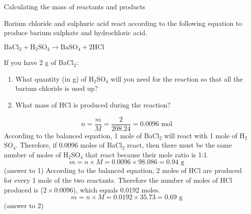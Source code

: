 \begin{wex}{Calculating the mass of reactants and products}{Barium chloride and sulphuric acid react according to the following equation to produce barium sulphate and hydrochloric acid.
\begin{center}
$\text{BaCl}_{2} + \text{H}_{2}\text{SO}_{4} \rightarrow \text{BaSO}_{4} + 2\text{HCl}$
\end{center}
If you have 2 g of BaCl$_{2}$:
\begin{enumerate}
\item{What quantity (in g) of H$_{2}$SO$_{4}$ will you need for the reaction so that all the barium chloride is used up?}
\item{What mass of HCl is produced during the reaction?}
\end{enumerate}
}{
\begin{equation*}
n = \frac{m}{M} = \frac{2}{208.24} = 0.0096 \text{ mol}
\end{equation*}
According to the balanced equation, 1 mole of BaCl$_{2}$ will react with 1 mole of H$_{2}$SO$_{4}$. Therefore, if 0.0096 moles of BaCl$_{2}$ react, then there must be the same number of moles of H$_{2}$SO$_{4}$ that react because their mole ratio is 1:1.
\begin{equation*}
m = n \times M = 0.0096 \times 98.086 = 0.94 \text{ g}
\end{equation*}
(answer to 1)
According to the balanced equation, 2 moles of HCl are produced for every 1 mole of the two reactants. Therefore the number of moles of HCl produced is ($2 \times 0.0096$), which equals 0.0192 moles. 
\begin{equation*}
m = n \times M = 0.0192 \times 35.73 = 0.69 \text{ g}
\end{equation*}
(answer to 2)
}
\end{wex}

